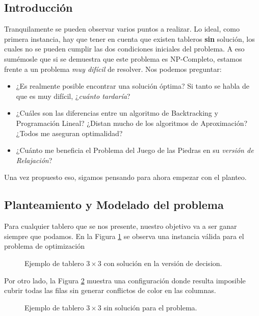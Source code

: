 \subsection{Introducción}

Tranquilamente se pueden observar varios puntos a realizar. Lo ideal, como primera instancia, hay que tener en cuenta que existen tableros \textbf{sin} solución, los cuales no se pueden cumplir las dos condiciones iniciales del problema. A eso sumémosle que si se demuestra que este problema es NP-Completo, estamos frente a un problema \textit{muy difícil} de resolver.
Nos podemos preguntar:
\begin{itemize}
    \item ¿Es realmente posible encontrar una solución óptima? Si tanto se habla de que es muy difícil, ¿\textit{cuánto tardaría}?
    \item ¿Cuáles son las diferencias entre un algoritmo de Backtracking y Programación Lineal? ¿Distan mucho de los algoritmos de Aproximación? ¿Todos me aseguran optimalidad?
    \item ¿Cuánto me beneficia el Problema del Juego de las Piedras en su \textit{versión de Relajación}?
\end{itemize}

Una vez propuesto eso, sigamos pensando para ahora empezar con el planteo.

\subsection{Planteamiento y Modelado del problema}

Para cualquier tablero que se nos presente, nuestro objetivo va a ser ganar siempre que podamos.
En la Figura \ref{fig:con_solucion} se observa una instancia válida para el problema de optimización

\begin{figure}[H]
    \centering
    
    \renewcommand{\thefigure}{1}
    \caption{Ejemplo de tablero $3 \times 3$ con solución en la versión de decision.}
    \label{fig:con_solucion}
\end{figure}

Por otro lado, la Figura \ref{fig:sin_solucion} muestra una configuración donde resulta imposible cubrir todas las filas sin generar conflictos de color en las columnas.

\begin{figure}[H]
    \centering
    
    \renewcommand{\thefigure}{1.1}
    \caption{Ejemplo de tablero $3 \times 3$ sin solución para el problema.}
    \label{fig:sin_solucion}
\end{figure}

